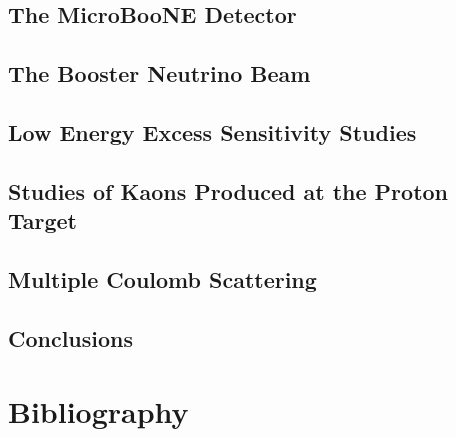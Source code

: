 \documentclass[11pt,openright,twoside,letterpaper,onecolumn]{report} %
\begin{document}
\chapter{The MicroBooNE Detector}
\label{sec:detector}
% 

\chapter{The Booster Neutrino Beam}
\label{sec:beam}
% 

\chapter{Low Energy Excess Sensitivity Studies}
\label{sec:LEEsensitivity}
% 

\chapter{Studies of Kaons Produced at the Proton Target}
\label{sec:kaon}


\chapter{Multiple Coulomb Scattering}
\label{sec:MCS}
% 

\chapter{Conclusions}
\label{sec:conclusions}
% 

% 

\part{Bibliography}
 

\end{document}
